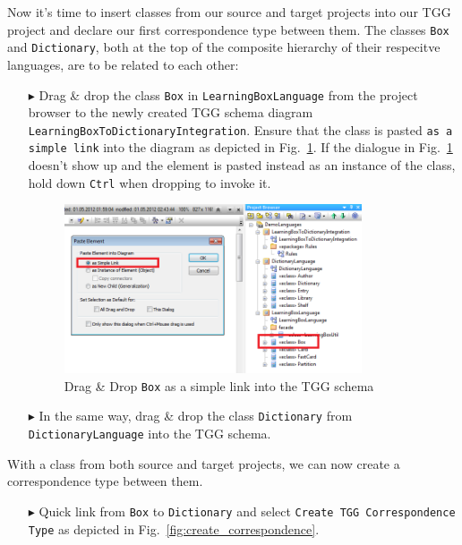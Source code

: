 Now it's time to insert classes from our source and target projects into our TGG project and declare our first correspondence type between them.
The classes \texttt{Box} and \texttt{Dictionary}, both at the top of the composite hierarchy of their respecitve languages, are to be related to each other:
\begin{enumerate}
\item[$\blacktriangleright$] Drag \& drop the class \texttt{Box} in \texttt{Learning\-Box\-Language} from the project 
browser to the newly created TGG schema diagram \texttt{Learning\-Box\-To\-Dictionary\-Integration}.
Ensure that the class is pasted \texttt{as a simple link} into the diagram as depicted in Fig.~\ref{fig:drag_drop_box}. 
If the dialogue in Fig.~\ref{fig:drag_drop_box} doesn't show up and the element is pasted instead as an instance of the class, hold down \texttt{Ctrl} when dropping to invoke it.

\begin{figure}[htbp]
\begin{center}
  \includegraphics[width=0.83\textwidth]{pics/tggBilder/tggSchema/tgg4}
  \caption{Drag \& Drop \texttt{Box} as a simple link into the TGG schema} 
  \label{fig:drag_drop_box}
\end{center}
\end{figure}

\item[$\blacktriangleright$] In the same way, drag \& drop the class \texttt{Dictionary} from \texttt{Dictionary\-Language} into the TGG schema. 
\end{enumerate}

With a class from both source and target projects, we can now create a correspondence type between them.
\begin{enumerate}
\item[$\blacktriangleright$] Quick link from \texttt{Box} to \texttt{Dictionary} and select \texttt{Create TGG Corres\-pon\-dence Type} as depicted in Fig.~\ref{fig:create_correspondence}.
\end{enumerate}

